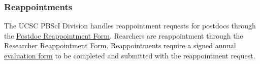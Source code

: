 \subsubsection{Reappointments}
\label{sec:reappointments}

The UCSC PBScI Division handles reappointment requests for postdocs through the
\href{https://ucscforms.wufoo.com/forms/s1jkgiac0mds045/}{Postdoc Reappointment Form}.
Rearchers are reappointment through the  
\href{https://ucscforms.wufoo.com/forms/sta0lov0j8fq7s/}{Researcher Reappointment Form}. Reappointments require
a signed \href{https://apo.ucsc.edu/policy/capm/docs/610-000-appendix-e.pdf}{annual evaluation form} to be completed and submitted with the reappointment request.
